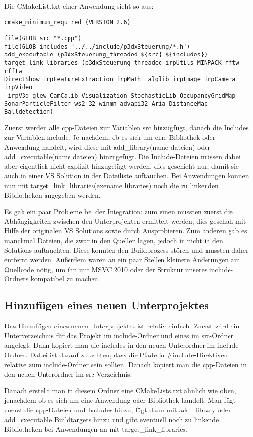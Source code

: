 Die CMakeList.txt einer Anwendung sieht so aus:
\begin{lstlisting}[captionpos=b,caption={CMakeLists.txt des Clients}]
cmake_minimum_required (VERSION 2.6)

file(GLOB src "*.cpp")
file(GLOB includes "../../include/p3dxSteuerung/*.h")
add_executable (p3dxSteuerung_threaded ${src} ${includes})
target_link_libraries (p3dxSteuerung_threaded irpUtils MINPACK fftw rfftw
DirectShow irpFeatureExtraction irpMath  alglib irpImage irpCamera irpVideo
 irpV3d glew CamCalib Visualization StochasticLib OccupancyGridMap
SonarParticleFilter ws2_32 winmm advapi32 Aria DistanceMap Balldetection)

\end{lstlisting}

Zuerst werden alle cpp-Dateien zur Variablen src hinzugfügt, danach die
Includes zur Variablen include. Je nachdem, ob es sich um eine Bibliothek
oder
Anwendung handelt, wird diese mit add\_library(name dateien) oder
add\_executable(name dateien) hinzugefügt. Die Include-Dateien müssen dabei
aber eigentlich nicht explizit hinzugefügt werden, dies geschieht nur,
damit
sie auch in einer VS Solution in der Dateiliste auftauchen. Bei Anwendungen
können nun mit target\_link\_libraries(exename libraries) noch die zu
linkenden
Bibliotheken angegeben werden.

Es gab ein paar Probleme bei der Integration: zum einen mussten zuerst die
Abhängigkeiten zwischen den Unterprojekten ermittelt werden, dies geschah
mit
Hilfe der originalen VS Solutions sowie durch Ausprobieren. Zum anderen gab
 es
manchmal Dateien, die zwar in den Quellen lagen, jedoch in nicht in den
Solutions auftauchten. Diese konnten den Buildprozess stören und mussten
daher
entfernt werden.
Außerdem waren an ein paar Stellen kleinere Änderungen am Quellcode nötig,
um
ihn mit MSVC 2010 oder der Struktur unseres include-Ordners kompatibel zu
machen.

\subsection{Hinzufügen eines neuen Unterprojektes}
\label{sec:hinz-eines-neuen-unterprojektes}
Das Hinzufügen eines neuen Unterprojektes ist relativ einfach.
Zuerst wird ein Unterverzeichnis für das Projekt im include-Ordner und
eines im
src-Ordner angelegt. Dann kopiert man die includes in den neuen Unterordner
 im
include-Ordner. Dabei ist darauf zu achten, dass die Pfade in
\#include-Direktiven relative zum include-Ordner sein sollten. Danach
kopiert
man die cpp-Dateien in den neuen Unterordner im src-Verzeichnis.

Danach erstellt man in diesem Ordner eine CMakeLists.txt ähnlich wie oben,
jenachdem ob es sich um eine Anwendung oder Bibliothek handelt. Man fügt
zuerst
die cpp-Dateien und Includes hinzu, fügt dann mit add\_library oder
add\_executable Buildtargets hinzu und gibt eventuell noch zu linkende
Bibliotheken bei Anwendungen an mit target\_link\_libraries.

